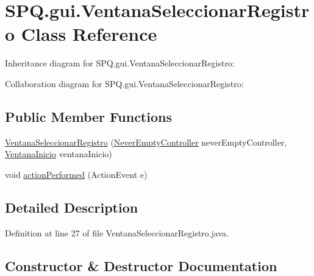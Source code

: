 \hypertarget{class_s_p_q_1_1gui_1_1_ventana_seleccionar_registro}{}\section{S\+P\+Q.\+gui.\+Ventana\+Seleccionar\+Registro Class Reference}
\label{class_s_p_q_1_1gui_1_1_ventana_seleccionar_registro}


Inheritance diagram for S\+P\+Q.\+gui.\+Ventana\+Seleccionar\+Registro\+:


Collaboration diagram for S\+P\+Q.\+gui.\+Ventana\+Seleccionar\+Registro\+:
\subsection*{Public Member Functions}
\begin{DoxyCompactItemize}
\item 
\mbox{\hyperlink{class_s_p_q_1_1gui_1_1_ventana_seleccionar_registro_ada3229c157db0999beb117311151fed1}{Ventana\+Seleccionar\+Registro}} (\mbox{\hyperlink{class_s_p_q_1_1controller_1_1_never_empty_controller}{Never\+Empty\+Controller}} never\+Empty\+Controller, \mbox{\hyperlink{class_s_p_q_1_1gui_1_1_ventana_inicio}{Ventana\+Inicio}} ventana\+Inicio)
\item 
void \mbox{\hyperlink{class_s_p_q_1_1gui_1_1_ventana_seleccionar_registro_aba6b384895ceebb731575e5fa0141ae3}{action\+Performed}} (Action\+Event e)
\end{DoxyCompactItemize}


\subsection{Detailed Description}


Definition at line 27 of file Ventana\+Seleccionar\+Registro.\+java.



\subsection{Constructor \& Destructor Documentation}
\mbox{\label{class_s_p_q_1_1gui_1_1_ventana_seleccionar_registro_ada3229c157db0999beb117311151fed1}} 
